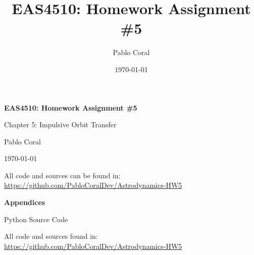 \documentclass[11pt]{article}
\title{EAS4510: Homework Assignment \#5}
\author{Pablo Coral}
\date{\today}
\newcommand{\dividerpage}[3]{%
    \clearpage
    \thispagestyle{empty}
    \begin{center}
        \vspace*{\fill}
        {\Huge\bfseries #1\par}
        \vspace{1cm}
        {\Large #2\par}
        \vspace{1.5cm}
        {\normalsize #3\par}
        \vspace*{\fill}
    \end{center}
    \clearpage
}
\newcommand{\repolink}{\url{https://github.com/PabloCoralDev/Astrodynamics-HW5}}
\begin{document}
\begin{titlepage}
    \centering
    \vspace*{4cm}
    {\LARGE\bfseries EAS4510: Homework Assignment \#5\par}
    \vspace{0.8cm}
    {\Large Chapter 5: Impulsive Orbit Transfer\par}
    \vspace{1.5cm}
    {\Large Pablo Coral\par}
    \vspace{0.5cm}
    {\large \today\par}
    \vspace{1cm}
    {\normalsize All code and sources can be found in: \repolink\par}
    \vfill
\end{titlepage}
\clearpage
{}
\setcounter{page}{1}








\dividerpage{Appendices}{Python Source Code}{All code and sources found in: \repolink}
\appendix

\end{document}
